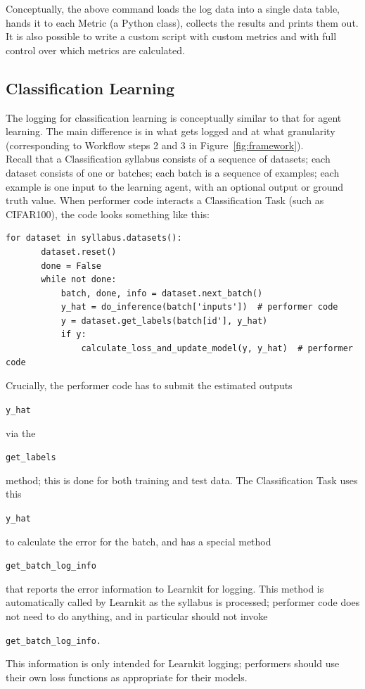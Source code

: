 Conceptually, the above command loads the log data into a single data table, hands it to each Metric (a Python class), collects the results and prints them out. It is also possible to write a custom script with custom metrics and with full control over which metrics are calculated.

\subsection*{Classification Learning}

The logging for classification learning is conceptually similar to that for agent learning. The main difference is in what gets logged and at what granularity (corresponding to Workflow steps 2 and 3 in Figure~\ref{fig:framework}).\\[0.1in]

Recall that a Classification syllabus consists of a sequence of datasets; each dataset consists of one or batches; each batch is a sequence of examples; each example is one input to the learning agent, with an optional output or ground truth value. When performer code interacts a Classification Task (such as CIFAR100), the code looks something like this:

\begin{small}
\begin{verbatim} 
for dataset in syllabus.datasets():       
       dataset.reset()
       done = False
       while not done:
           batch, done, info = dataset.next_batch()
           y_hat = do_inference(batch['inputs'])  # performer code
           y = dataset.get_labels(batch[id'], y_hat)
           if y:
               calculate_loss_and_update_model(y, y_hat)  # performer code 
\end{verbatim}
\end{small}

Crucially, the performer code has to submit the estimated outputs
\begin{small}
\verb|y_hat|
\end{small}via the
\begin{small}
\verb|get_labels|
\end{small}method; this is done for both training and test data. The Classification Task uses this
\begin{small}
\verb|y_hat|
\end{small}to calculate the error for the batch, and has a special method
\begin{small}
\verb|get_batch_log_info|
\end{small}that reports the error information to Learnkit for logging. This method is automatically called by Learnkit as the syllabus is processed; performer code does not need to do anything, and in particular should not invoke
\begin{small}
\verb|get_batch_log_info.|
\end{small}This information is only intended for Learnkit logging; performers should use their own loss functions as appropriate for their models.


